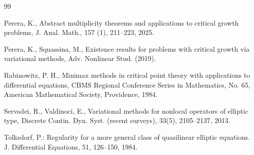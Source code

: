 \documentclass[12pt]{extarticle}
\theoremstyle{definition}
\theoremstyle{remark}
\theoremstyle{definition}
\numberwithin{equation}{section}
\numberwithin{equation}{section}
\begin{document}
{\begin{thebibliography}{99}
			
			 Perera, K., Abstract multiplicity theorems and applications to critical growth problems,
			J. Anal. Math., 157 (1), 211--223, 2025.
			
			
			
%			
			
	


 Perera, K., Squassina, M., Existence results for problems with critical growth via variational methods, Adv. Nonlinear Stud. (2019).

 Rabinowitz, P. H., Minimax methods in critical point theory with applications to differential equations, CBMS Regional Conference Series in Mathematics, No. 65, American Mathematical Society, Providence, 1984.

 Servadei, R., Valdinoci, E., Variational methods for nonlocal operators of elliptic type, Discrete Contin. Dyn. Syst. (recent surveys), 33(5), 2105--2137, 2013.

Tolksdorf, P.: Regularity for a more general class of quasilinear elliptic equations. J. Differential Equations, 51, 126--150, 1984.





			
			
			
			
			
			
		\end{thebibliography}
	}
\end{document}
